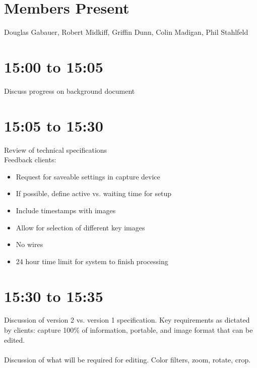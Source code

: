 \documentclass{article}
\begin{document}
    \thispagestyle{fancy}
	
	\section*{Members Present}
		Douglas Gabauer, Robert Midkiff, Griffin Dunn, Colin Madigan, Phil Stahlfeld
		
	\section*{15:00 to 15:05}
		Discuss progress on background document
		
	\section*{15:05 to 15:30}
		Review of technical specifications\\
		Feedback clients:
		\begin{itemize}
			\item Request for saveable settings in capture device
			\item If possible, define active vs. waiting time for setup
			\item Include timestamps with images
			\item Allow for selection of different key images
			\item No wires
			\item 24 hour time limit for system to finish processing
		\end{itemize}
		
	\section*{15:30 to 15:35}
		Discussion of version 2 vs. version 1 specification. Key requirements as dictated by clients: capture 100\% of information, portable, and image format that can be edited. \\
		\\
		Discussion of what will be required for editing. Color filters, zoom, rotate, crop.
		
		
\end{document}
